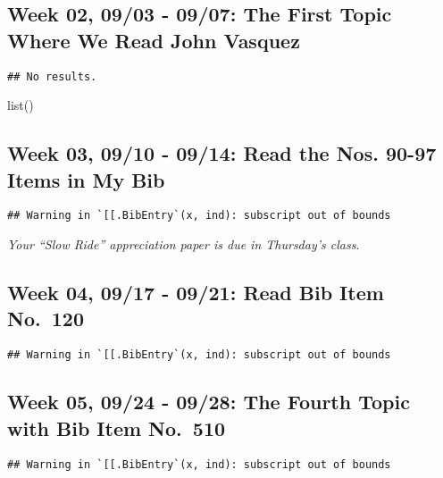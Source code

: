 \documentclass[11pt,]{article}
\begin{document}
\hypertarget{week-02-0903---0907-the-first-topic-where-we-read-john-vasquez}{%
\subsection{Week 02, 09/03 - 09/07: The First Topic Where We Read John
Vasquez}\label{week-02-0903---0907-the-first-topic-where-we-read-john-vasquez}}

\begin{verbatim}
## No results.
\end{verbatim}

list()

\hypertarget{week-03-0910---0914-read-the-nos.-90-97-items-in-my-bib}{%
\subsection{Week 03, 09/10 - 09/14: Read the Nos. 90-97 Items in My
Bib}\label{week-03-0910---0914-read-the-nos.-90-97-items-in-my-bib}}

\begin{verbatim}
## Warning in `[[.BibEntry`(x, ind): subscript out of bounds
\end{verbatim}

\emph{Your ``Slow Ride'' appreciation paper is due in Thursday's class}.

\hypertarget{week-04-0917---0921-read-bib-item-no.-120}{%
\subsection{Week 04, 09/17 - 09/21: Read Bib Item
No.~120}\label{week-04-0917---0921-read-bib-item-no.-120}}

\begin{verbatim}
## Warning in `[[.BibEntry`(x, ind): subscript out of bounds
\end{verbatim}

\hypertarget{week-05-0924---0928-the-fourth-topic-with-bib-item-no.-510}{%
\subsection{Week 05, 09/24 - 09/28: The Fourth Topic with Bib Item
No.~510}\label{week-05-0924---0928-the-fourth-topic-with-bib-item-no.-510}}

\begin{verbatim}
## Warning in `[[.BibEntry`(x, ind): subscript out of bounds
\end{verbatim}
\end{document}
